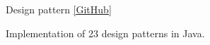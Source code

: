 \begin{cventries}
  \projectentry
    {}
    {Design pattern \href{https://github.com/bookmountain/design-pattern-java}{\footnotesize\color{ao}[GitHub]}} %
{}
{}
    {
      \begin{cvitems} %
        \item {Implementation of 23 design patterns in Java.}
      \end{cvitems}
    }
\end{cventries}